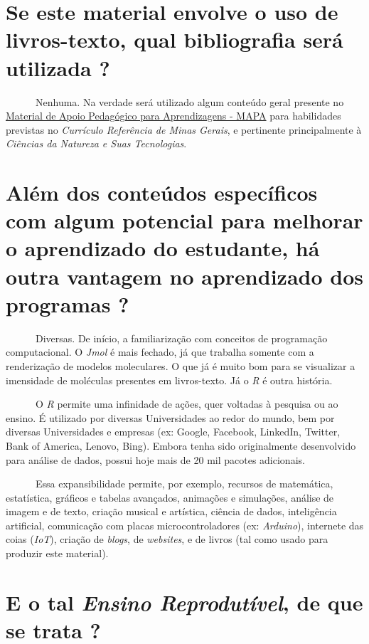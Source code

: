 \documentclass[
  letterpaper,
  DIV=11,
  numbers=noendperiod]{scrreprt}
\begin{document}
\section{Se este material envolve o uso de livros-texto, qual
bibliografia será utilizada
?}\label{se-este-material-envolve-o-uso-de-livros-texto-qual-bibliografia-seruxe1-utilizada}

~~~~~~Nenhuma. Na verdade será utilizado algum conteúdo geral presente
no
\href{https://seliga.educacao.mg.gov.br/cardenos-mapa/ensino-m\%C3\%A9dio-2024}{Material
de Apoio Pedagógico para Aprendizagens - MAPA} para habilidades
previstas no \emph{Currículo Referência de Minas Gerais}, e pertinente
principalmente à \emph{Ciências da Natureza e Suas Tecnologias}.

\section{Além dos conteúdos específicos com algum potencial para
melhorar o aprendizado do estudante, há outra vantagem no aprendizado
dos programas
?}\label{aluxe9m-dos-conteuxfados-especuxedficos-com-algum-potencial-para-melhorar-o-aprendizado-do-estudante-huxe1-outra-vantagem-no-aprendizado-dos-programas}

~~~~~~Diversas. De início, a familiarização com conceitos de programação
computacional. O \emph{Jmol} é mais fechado, já que trabalha somente com
a renderização de modelos moleculares. O que já é muito bom para se
visualizar a imensidade de moléculas presentes em livros-texto. Já o
\emph{R} é outra história.

~~~~~~O \emph{R} permite uma infinidade de ações, quer voltadas à
pesquisa ou ao ensino. É utilizado por diversas Universidades ao redor
do mundo, bem por diversas Universidades e empresas (ex: Google,
Facebook, LinkedIn, Twitter, Bank of America, Lenovo, Bing). Embora
tenha sido originalmente desenvolvido para análise de dados, possui hoje
mais de 20 mil pacotes adicionais.

~~~~~~Essa expansibilidade permite, por exemplo, recursos de matemática,
estatística, gráficos e tabelas avançados, animações e simulações,
análise de imagem e de texto, criação musical e artística, ciência de
dados, inteligência artificial, comunicação com placas
microcontroladores (ex: \emph{Arduino}), internete das coias
(\emph{IoT}), criação de \emph{blogs}, de \emph{websites}, e de livros
(tal como usado para produzir este material).

\section{\texorpdfstring{E o tal \emph{Ensino Reprodutível}, de que se
trata
?}{E o tal Ensino Reprodutível, de que se trata ?}}\label{e-o-tal-ensino-reprodutuxedvel-de-que-se-trata}
\end{document}
